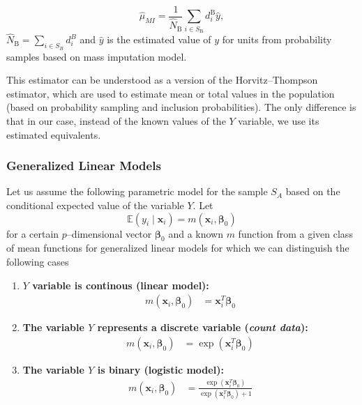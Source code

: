 \documentclass[
]{jss}
\begin{document}
\begin{equation}
\hat{\mu}_{M I}=\frac{1}{\hat{N}_{\mathrm{B}}} \sum_{i \in S_{\mathrm{B}}} d_i^{\mathrm{B}} \hat{y}, 
\end{equation} \(\hat{N}_{\mathrm{B}} = \sum_{i \in S_B} d_i^B\) and
\(\hat{y}\) is the estimated value of \(y\) for units from probability
samples based on mass imputation model.

This estimator can be understood as a version of the Horvitz--Thompson
estimator, which are used to estimate mean or total values in the
population (based on probability sampling and inclusion probabilities).
The only difference is that in our case, instead of the known values of
the \(Y\) variable, we use its estimated equivalents.

\hypertarget{generalized-linear-models}{%
\subsubsection{Generalized Linear
Models}\label{generalized-linear-models}}

Let us assume the following parametric model for the sample \(S_A\)
based on the conditional expected value of the variable \(Y\). Let
\begin{equation}
\mathbb{E}\left(y_i \mid \boldsymbol{x}_i\right)=m\left(\boldsymbol{x}_i, \boldsymbol{\beta}_0\right)
\end{equation} for a certain \(p\)--dimensional vector
\(\boldsymbol{\beta}_0\) and a known \(m\) function from a given class
of mean functions for generalized linear models for which we can
distinguish the following cases

\begin{enumerate}
    \item \textbf{\( Y \) variable is continous (linear model):}
    \begin{align*}
        m\left(\boldsymbol{x}_i, \boldsymbol{\beta}_0\right) &= \boldsymbol{x}_i^T \boldsymbol{\beta}_0
    \end{align*}

    \item \textbf{The variable \( Y \)  represents a discrete variable (\textit{count data}):}
    \begin{align*}
        m\left(\boldsymbol{x}_i, \boldsymbol{\beta}_0\right) &= \exp \left(\boldsymbol{x}_i^T \boldsymbol{\beta}_0\right)
    \end{align*}

    \item \textbf{The variable \( Y \)  is binary (logistic model):}
    \begin{align*}
        m\left(\boldsymbol{x}_i, \boldsymbol{\beta}_0\right) &= \frac{\exp \left(\boldsymbol{x}_i^T \boldsymbol{\beta}_0\right)}{\exp \left(\boldsymbol{x}_i^T \boldsymbol{\beta}_0\right) + 1}
    \end{align*}
\end{enumerate}
\end{document}
